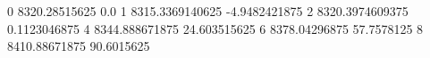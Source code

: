 0 8320.28515625 0.0
1 8315.3369140625 -4.9482421875
2 8320.3974609375 0.1123046875
4 8344.888671875 24.603515625
6 8378.04296875 57.7578125
8 8410.88671875 90.6015625
